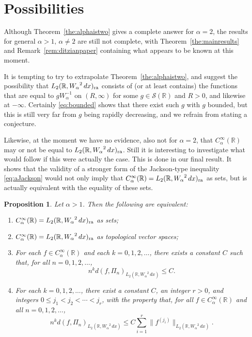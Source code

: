 \documentclass[12pt, reqno]{amsart}
\numberwithin{equation}{section}
\theoremstyle{plain}
\newtheorem{proposition}[theorem]{Proposition}
\theoremstyle{definition}
\begin{document}
\section{Possibilities}\label{sec:questions}

Although Theorem~\ref{the:alphaistwo} gives a complete answer for $\alpha=2$, the results for general $\alpha>1,\,\alpha\neq 2$ are still not complete, with Theorem~\ref{the:mainresults} and Remark~\ref{rem:ditzianpaper} containing what appears to be known at this moment.

It is tempting to try to extrapolate Theorem~\ref{the:alphaistwo}, and suggest the possibility that ${L_2({{\mathbb R}},{W_\alpha}^2\,dx)_{\textup{ra}}}$ consists of (or at least contains) the functions that are equal to $g W_\alpha^{-1}$ on $(R,\infty)$ for some $g\in{{\mathcal S}}({{\mathbb R}})$ and $R>0$, and likewise at $-\infty$. Certainly \eqref{eq:bounded} shows that there exist such $g$ with $g$ bounded, but this is still very far from $g$ being rapidly decreasing, and we refrain from stating a conjecture.

Likewise, at the moment we have no evidence, also not for $\alpha=2$, that ${{C_\alpha^\infty({{\mathbb R}})}}$ may or not be equal to ${L_2({{\mathbb R}},{W_\alpha}^2\,dx)_{\textup{ra}}}$. Still it is interesting to investigate what would follow if this were actually the case. This is done in our final result. It shows that the validity of a stronger form of the Jackson-type inequality \eqref{eq:aJackson} would not only imply that ${{C_\alpha^\infty({{\mathbb R}})}}={L_2({{\mathbb R}},{W_\alpha}^2\,dx)_{\textup{ra}}}$ as sets, but is actually equivalent with the equality of these sets.

\begin{proposition}\label{prop:equivalences}
Let $\alpha>1$. Then the following are equivalent:
\begin{enumerate}
 \item ${{C_\alpha^\infty({{\mathbb R}})}}={L_2({{\mathbb R}},{W_\alpha}^2\,dx)_{\textup{ra}}}$ as sets;
 \item ${{C_\alpha^\infty({{\mathbb R}})}}={L_2({{\mathbb R}},{W_\alpha}^2\,dx)_{\textup{ra}}}$ as topological vector spaces;
 \item For each $f\in {{C_\alpha^\infty({{\mathbb R}})}}$ and each $k=0,1,2,\ldots$, there exists a constant $C$ such that, for all $n=0,1,2,\ldots$,
 \begin{equation}\label{eq:aactualJackonpointwise}
 n^k d(f,\Pi_n)_{{L_2({{\mathbb R}}, {W_\alpha}^2\,dx)}}\leq C.
 \end{equation}
 \item For each $k=0,1,2,\ldots$, there exist a constant $C$, an integer $r>0$, and integers $0\leq j_1<j_2<\cdots<j_r$, with the property that, for all $f\in{{C_\alpha^\infty({{\mathbb R}})}}$ and all $n=0,1,2,\ldots$,
 \begin{equation}\label{eq:aactualJacksonuniform}
 n^k d(f,\Pi_n)_{{L_2({{\mathbb R}}, {W_\alpha}^2\,dx)}}\leq C \sum_{i=1}^r\| f^{(j_i)}\|_{{L_2({{\mathbb R}}, {W_\alpha}^2\,dx)}}.
\end{equation}
\end{enumerate}
\end{proposition}
\end{document}
